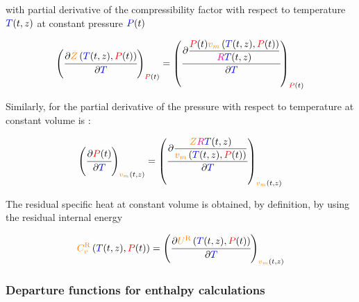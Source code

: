 \documentclass[../Article_Model_Parameters.tex]{subfiles}
\begin{document}
	with partial derivative of the compressibility factor with respect to temperature ${\color{blue}T}(t,z)$ at constant pressure ${\color{blue}P}(t)$

	{\footnotesize
	\begin{equation}
		\left(\cfrac{\partial{\color{orange}Z}\left({\color{blue}T}(t,z), {\color{red}P}(t)\right)}{\partial {\color{blue}T}}\right)_{{\color{red}P}(t)} = \left(\cfrac{\partial \dfrac{{\color{red}P}(t) {\color{orange}v_m}\left({\color{blue}T}(t,z), {\color{red}P}(t)\right)}{{\color{magenta}R}{\color{blue}T}(t,z)}}{\partial {\color{blue}T}}\right)_{{\color{red}P}(t)} \label{eq: dZdT}
	\end{equation} }

	Similarly, for the partial derivative of the pressure with respect to temperature at constant volume is :
	
	{\footnotesize
	\begin{equation}
		\left(\cfrac{\partial {\color{red}P}(t)}{\partial {\color{blue}T}}\right)_{{\color{orange}v_m}(t,z)} = \left( \cfrac{\partial{\dfrac{{\color{orange}Z}{\color{magenta}R}{\color{blue}T}(t,z)}{{\color{orange}v_m}\left({\color{blue}T}(t,z), {\color{red}P}(t)\right)}}}{\partial{\color{blue}T}}\right)_{{\color{orange}v_m}(t,z)} \label{eq: dPdT}
	\end{equation} }
	
	The residual specific heat at constant volume is obtained, by definition, by using the residual internal energy
	
	{\footnotesize
	\begin{equation}
		{\color{orange}C_v^{\text{R}}}\left({\color{blue}T}(t,z),{\color{red}P}(t)\right) = \left(\cfrac{\partial{\color{orange}U^{\text{R}}}\left({\color{blue}T}(t,z),{\color{red}P}(t)\right)}{\partial {\color{blue}T}}\right)_{{\color{orange}v_m}(t,z)} \label{eq: CvR}
	\end{equation} }
	
	
	\subsubsection{Departure functions for enthalpy calculations} \label{CH:Enthalpy}
	
\end{document}
